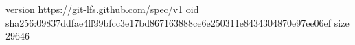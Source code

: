 version https://git-lfs.github.com/spec/v1
oid sha256:09837ddfae4ff99bfcc3e17bd867163888ce6e250311e8434304870e97ee06ef
size 29646
